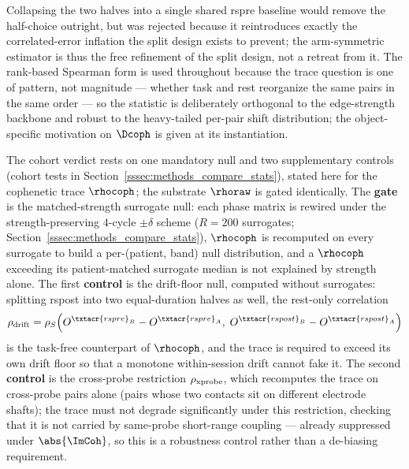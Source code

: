 Collapsing the two halves into a single shared \acrshort{rspre} baseline would remove the half-choice outright, but was rejected because it reintroduces exactly the correlated-error inflation the split design exists to prevent; the arm-symmetric estimator is thus the free refinement of the split design, not a retreat from it. The rank-based Spearman form is used throughout because the trace question is one of pattern, not magnitude --- whether task and rest reorganize the same pairs in the same order --- so the statistic is deliberately orthogonal to the edge-strength backbone and robust to the heavy-tailed per-pair shift distribution; the object-specific motivation on \(\Dcoph\) is given at its instantiation.

The cohort verdict rests on one mandatory null and two supplementary controls (cohort tests in Section~\ref{sssec:methods_compare_stats}), stated here for the cophenetic trace \(\rhocoph\); the substrate \(\rhoraw\) is gated identically. The \textbf{gate} is the matched-strength surrogate null: each phase matrix is rewired under the strength-preserving \(4\)-cycle \(\pm\delta\) scheme (\(R = 200\) surrogates; Section~\ref{sssec:methods_compare_stats}), \(\rhocoph\) is recomputed on every surrogate to build a per-(patient, band) null distribution, and a \(\rhocoph\) exceeding its patient-matched surrogate median is not explained by strength alone. The first \textbf{control} is the drift-floor null, computed without surrogates: splitting \acrshort{rspost} into two equal-duration halves as well, the rest-only correlation
\begin{equation}
    \rho_{\rm drift} = \rho_{S}\!\left(O^{\txtacr{rspre}_{B}} - O^{\txtacr{rspre}_{A}},\; O^{\txtacr{rspost}_{B}} - O^{\txtacr{rspost}_{A}}\right)
    \label{eq:methods_perpair_drift}
\end{equation}
is the task-free counterpart of \(\rhocoph\), and the trace is required to exceed its own drift floor so that a monotone within-session drift cannot fake it. The second \textbf{control} is the cross-probe restriction \(\rho_{\rm xprobe}\), which recomputes the trace on cross-probe pairs alone (pairs whose two contacts sit on different electrode shafts); the trace must not degrade significantly under this restriction, checking that it is not carried by same-probe short-range coupling --- already suppressed under \(\abs{\ImCoh}\), so this is a robustness control rather than a de-biasing requirement.
%

